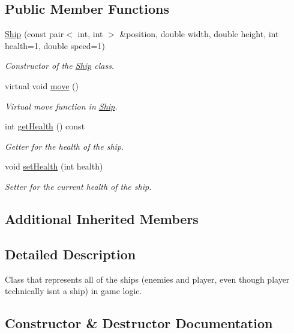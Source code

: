 \subsection*{Public Member Functions}
\begin{DoxyCompactItemize}
\item 
\hyperlink{classGameLogic_1_1Ship_a2fabf559fb5b1f1c14c3da133bc42596}{Ship} (const pair$<$ int, int $>$ \&position, double width, double height, int health=1, double speed=1)
\begin{DoxyCompactList}\small\item\em Constructor of the \hyperlink{classGameLogic_1_1Ship}{Ship} class. \end{DoxyCompactList}\item 
virtual void \hyperlink{classGameLogic_1_1Ship_aaab731578b80b9e1920e3f2af2bc2f8c}{move} ()
\begin{DoxyCompactList}\small\item\em Virtual move function in \hyperlink{classGameLogic_1_1Ship}{Ship}. \end{DoxyCompactList}\item 
int \hyperlink{classGameLogic_1_1Ship_a5529646cead801dc8cc9d47f2f3d1d92}{get\+Health} () const
\begin{DoxyCompactList}\small\item\em Getter for the health of the ship. \end{DoxyCompactList}\item 
void \hyperlink{classGameLogic_1_1Ship_af0604b26727de4793a03464753ef443e}{set\+Health} (int health)
\begin{DoxyCompactList}\small\item\em Setter for the current health of the ship. \end{DoxyCompactList}\end{DoxyCompactItemize}
\subsection*{Additional Inherited Members}


\subsection{Detailed Description}
Class that represents all of the ships (enemies and player, even though player technically isn\textquotesingle{}t a ship) in game logic. 

\subsection{Constructor \& Destructor Documentation}
\mbox{\label{classGameLogic_1_1Ship_a2fabf559fb5b1f1c14c3da133bc42596}} 
